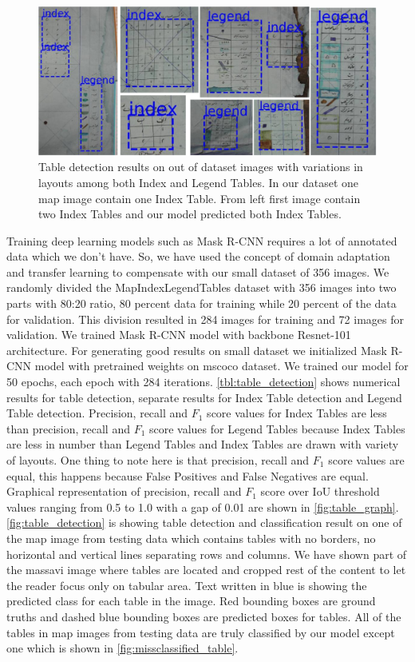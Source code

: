 \begin{figure}[h!]
    \centering
    \includegraphics[width=\linewidth, angle=0]{resultOutOfDataset-highQuality.pdf}
    \caption{Table detection results on out of dataset images with variations in layouts among both Index and Legend Tables. In our dataset one map image contain one Index Table. From left first image contain two Index Tables and our model predicted both Index Tables. }
    \label{fig:outOfDataset}
\end{figure}
Training deep learning models such as Mask R-CNN requires a lot of annotated data which we don't have. So, we have used the concept of domain adaptation and transfer learning to compensate with our small dataset of 356 images. We randomly divided the MapIndexLegendTables dataset with 356 images into two parts with 80:20 ratio, 80 percent data for training while 20 percent of the data for validation. This division resulted in 284 images for training and 72 images for validation. We trained Mask R-CNN model with backbone Resnet-101 architecture. For generating good results on small dataset we initialized Mask R-CNN model with pretrained weights on mscoco dataset. We trained our model for 50 epochs, each epoch with 284 iterations. \autoref{tbl:table_detection} shows numerical results for table detection, separate results for Index Table detection and Legend Table detection. Precision, recall and $F_1$ score values for Index Tables are less than precision, recall and $F_1$ score values for Legend Tables because Index Tables are less in number than Legend Tables and Index Tables are drawn with variety of layouts. One thing to note here is that precision, recall and $F_1$ score values are equal, this happens because False Positives and False Negatives are equal. Graphical representation of precision, recall and $F_1$ score over IoU threshold values ranging from 0.5 to 1.0 with a gap of 0.01 are shown in \autoref{fig:table_graph}. \autoref{fig:table_detection} is showing table detection and classification result on one of the map image from testing data which contains tables with no borders, no horizontal and vertical lines separating rows and columns. We have shown part of the massavi image where tables are located and cropped rest of the content to let the reader focus only on tabular area. Text written in blue is showing the predicted class for each table in the image. Red bounding boxes are ground truths and dashed blue bounding boxes are predicted boxes for tables. All of the tables in map images from testing data are truly classified by our model except one which is shown in \autoref{fig:missclassified_table}.
